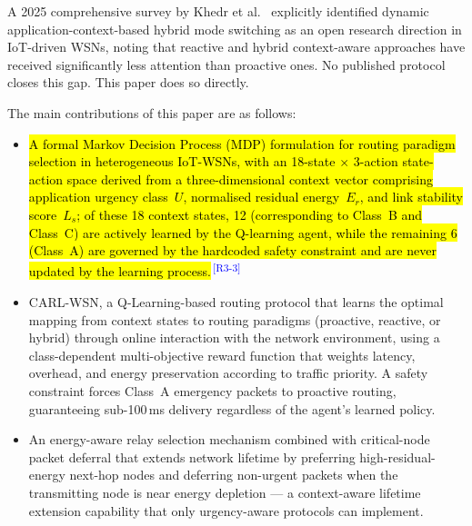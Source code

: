 \documentclass[12pt]{article}
\newcommand{\rtag}[1]{\textsuperscript{\textcolor{blue}{\scriptsize\,[#1]}}}
\newcommand{\hlx}[1]{{\exhyphenpenalty=10000\hyphenpenalty=10000\let\ \nobreakspace\hl{#1}}}
\begin{document}
A 2025 comprehensive survey by Khedr et al.~\cite{roberts2025}
explicitly identified dynamic application-context-based hybrid mode
switching as an open research direction in IoT-driven WSNs, noting
that reactive and hybrid context-aware approaches have received
significantly less attention than proactive ones. No published protocol closes this gap. This paper does so directly.

The main contributions of this paper are as follows:

\begin{itemize}
\item \hlx{A formal Markov Decision Process (MDP) formulation for routing
paradigm selection in heterogeneous IoT-WSNs, with an 18-state
$\times$ 3-action state-action space derived from a three-dimensional
context vector comprising application urgency class~$U$, normalised
residual energy~$E_r$, and link stability score~$L_s$; of these 18
context states, 12 (corresponding to Class~B and Class~C) are
actively learned by the Q-learning agent, while the remaining 6
(Class~A) are governed by the hardcoded safety constraint and are
never updated by the learning process.}\rtag{R3-3}

\item CARL-WSN, a Q-Learning-based routing protocol that learns the
optimal mapping from context states to routing paradigms (proactive,
reactive, or hybrid) through online interaction with the network
environment, using a class-dependent multi-objective reward function
that weights latency, overhead, and energy preservation according to
traffic priority. A safety constraint forces Class~A emergency
packets to proactive routing, guaranteeing sub-100\,ms delivery
regardless of the agent's learned policy.

\item An energy-aware relay selection mechanism combined with
critical-node packet deferral that extends network lifetime by
preferring high-residual-energy next-hop nodes and deferring
non-urgent packets when the transmitting node is near energy
depletion --- a context-aware lifetime extension capability that
only urgency-aware protocols can implement.


\end{itemize}
\end{document}
